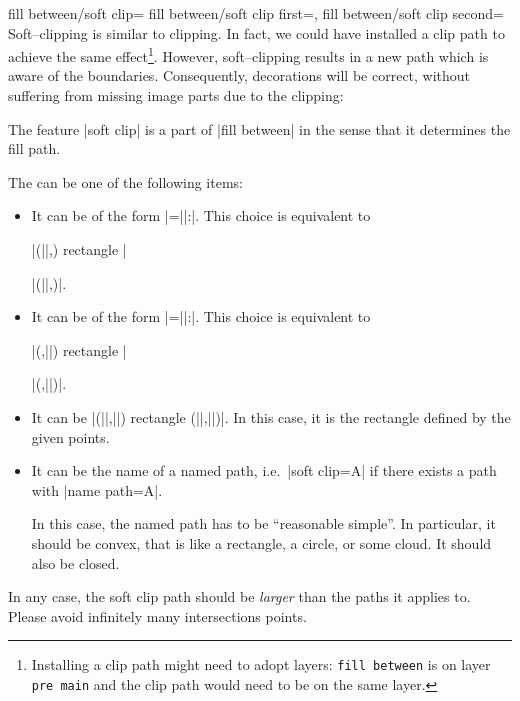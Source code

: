 \begin{tikzkeylist}{%
	fill between/soft clip=
	fill between/soft clip first=,
	fill between/soft clip second=%
}
	Soft--clipping is similar to clipping. In fact, we could have installed a clip path to achieve the same effect\footnote{Installing a clip path might need to adopt layers: \texttt{fill between} is on layer \texttt{pre main} and the clip path would need to be on the same layer.}. However, soft--clipping results in a new path which is aware of the boundaries. Consequently, decorations will be correct, without suffering from missing image parts due to the clipping:
\begin{codeexample}[]
\end{codeexample}

	The feature |soft clip| is a part of |fill between| in the sense that it determines the fill path.

	The  can be one of the following items:
	\begin{itemize}
		\item It can be of the form |=||:|. This choice is equivalent to

			|(||,) rectangle |

			|(||,)|.
		\item It can be of the form |=||:|. This choice is equivalent to

			|(,||) rectangle |

			|(,||)|.
		\item It can be |(||,||) rectangle (||,||)|. In this case, it is the rectangle defined by the given points.
		\item It can be the name of a named path, i.e.\ |soft clip=A| if there exists a path with |name path=A|.

		In this case, the named path has to be ``reasonable simple''. In particular, it should be convex, that is like a rectangle, a circle, or some cloud. It should also be closed.
	\end{itemize}
	In any case, the soft clip path should be \emph{larger} than the paths it applies to. Please avoid infinitely many intersections points.


\end{tikzkeylist}
